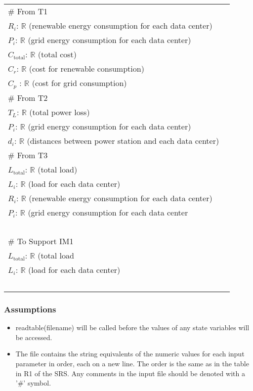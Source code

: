\documentclass[12pt, titlepage]{article}
\begin{document}
\renewcommand{\arraystretch}{1.2}
\begin{longtable*}[l]{l} 
\# From T1\\
$R_i$: $\mathbb{R}$  (renewable energy consumption for each data center)\\
$P_i$: $\mathbb{R}$ (grid energy consumption for each data center)\\
$C_\text{total}$: $\mathbb{R}$ (total cost)\\
$C_r$: $\mathbb{R}$ (cost for renewable consumption)\\
$C_p$ : $\mathbb{R}$ (cost for grid consumption)
~\\
\# From T2\\
$T_L$: $\mathbb{R}$ (total power loss)\\
$P_i$: $\mathbb{R}$ (grid energy consumption for each data center)\\
$d_i$: $\mathbb{R}$ (distances between power station and each data center)
~\\
\noindent \# From T3\\
$L_\text{total}$: $\mathbb{R}$ (total load)\\ 
$L_i$: $\mathbb{R}$ (load for each data center)\\
$R_i$: $\mathbb{R}$ (renewable energy consumption for each data center)\\
$P_i$: $\mathbb{R}$ (grid energy consumption for each data center\\
~\\
\# To Support IM1\\
$L_\text{total}$: $\mathbb{R}$ (total load\\
$L_i$: $\mathbb{R}$ (load for each data center)\\ 
~\\

\end{longtable*}

\subsubsection{Assumptions}

\begin{itemize}

\item readtable(filename) will be called before the values of any state variables will be accessed.

\item The file contains the string equivalents of the numeric values for
each input parameter in order, each on a new line. The order is the same as in
the table in R1 of the SRS. Any comments in the input file should be denoted
with a '\#' symbol.

\end{itemize}
\end{document}
